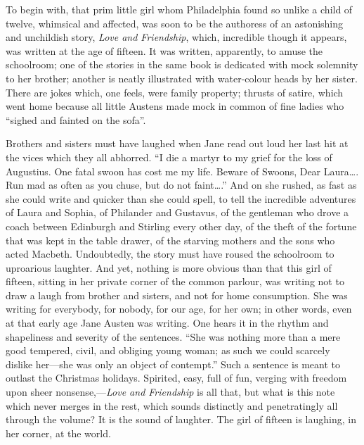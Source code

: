 To begin with, that prim little girl whom Philadelphia found so unlike a child of twelve, whimsical and affected, was soon to be the authoress of an astonishing and unchildish story, \textit{Love and Friendship}, which, incredible though it appears, was written at the age of fifteen. It was written, apparently, to amuse the schoolroom; one of the stories in the same book is dedicated with mock solemnity to her brother; another is neatly illustrated with water-colour heads by her sister. There are jokes which, one feels, were family property; thrusts of satire, which went home because all little Austens made mock in common of fine ladies who ``sighed and fainted on the sofa''.

Brothers and sisters must have laughed when Jane read out loud her last hit at the vices which they all abhorred. ``I die a martyr to my grief for the loss of Augustius. One fatal swoon has cost me my life. Beware of Swoons, Dear Laura\dots . Run mad as often as you chuse, but do not faint\dots .'' And on she rushed, as fast as she could write and quicker than she could spell, to tell the incredible adventures of Laura and Sophia, of Philander and Gustavus, of the gentleman who drove a coach between Edinburgh and Stirling every other day, of the theft of the fortune that was kept in the table drawer, of the starving mothers and the sons who acted Macbeth. Undoubtedly, the story must have roused the schoolroom to uproarious laughter. And yet, nothing is more obvious than that this girl of fifteen, sitting in her private corner of the common parlour, was writing not to draw a laugh from brother and sisters, and not for home consumption. She was writing for everybody, for nobody, for our age, for her own; in other words, even at that early age Jane Austen was writing. One hears it in the rhythm and shapeliness and severity of the sentences. ``She was nothing more than a mere good tempered, civil, and obliging young woman; as such we could scarcely dislike her—she was only an object of contempt.'' Such a sentence is meant to outlast the Christmas holidays. Spirited, easy, full of fun, verging with freedom upon sheer nonsense,—\textit{Love and Friendship} is all that, but what is this note which never merges in the rest, which sounds distinctly and penetratingly all through the volume? It is the sound of laughter. The girl of fifteen is laughing, in her corner, at the world.

